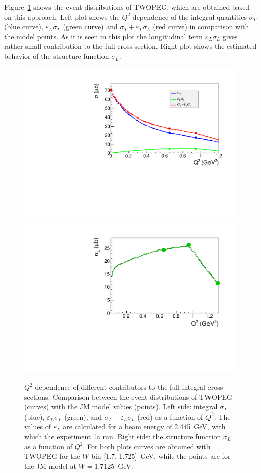 \begin{itemize}
Figure~\ref{fig:sig_gen} shows the event distributions of TWOPEG, which are obtained based on this approach. Left plot shows the $Q^2$ dependence of the integral  quantities $\sigma_{T}$ (blue curve), $\varepsilon_{L}\sigma_{L}$ (green curve) and $\sigma_{T}+\varepsilon_{L}\sigma_{L}$ (red curve) in comparison with the model points. As it is seen in this plot the longitudinal term $\varepsilon_{L}\sigma_{L}$ gives rather small contribution to the full cross section. Right plot shows the estimated behavior of the structure function $\sigma_{L}$. 

\begin{figure}[htp]
\begin{center}
\includegraphics[height=0.35\textwidth]{pictures/obt_weights/t_epsl_tot_gen_mod_comp.pdf}
\includegraphics[height=0.35\textwidth]{pictures/obt_weights/sig_l_no_epsl.pdf}
\caption{\small $Q^2$ dependence of different contributors to the full integral cross sections. Comparison between the event distributions of TWOPEG (curves) with the JM model values (points). Left side: integral $\sigma_{T}$ (blue), $\varepsilon_{L}\sigma_{L}$ (green), and $\sigma_{T}+\varepsilon_{L}\sigma_{L}$ (red) as a function of $Q^2$. The values of $\varepsilon_{L}$ are calculated for a beam energy of 2.445~GeV, with which the experiment 1a ran. Right side: the structure function $\sigma_{L}$ as a function of $Q^2$. For both plots curves are obtained with TWOPEG for the $W$-bin [1.7, 1.725]~GeV, while the points are for the JM model at $W=1.7125$~GeV.  } \label{fig:sig_gen}
\end{center}
\end{figure}


\end{itemize}
